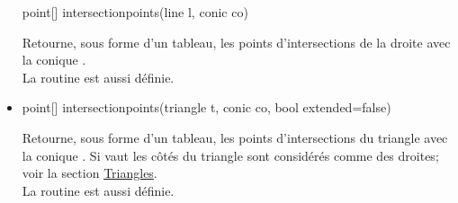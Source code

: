 \documentclass[pdftex]{article}
\begin{document}
\begin{itemize}
  \begin{Vcolor}
    point[] intersectionpoints(line l, conic co)
  \end{Vcolor}
  Retourne, sous forme d'un tableau, les points d'intersections de la
  droite  avec la conique .\\
  La routine  est aussi définie.
\item {}
  \begin{Vcolor}
    point[] intersectionpoints(triangle t, conic co, bool extended=false)
  \end{Vcolor}
  Retourne, sous forme d'un tableau, les points d'intersections du
  triangle  avec la conique . Si 
  vaut  les côtés du triangle sont considérés comme des
  droites; voir la section \href{#section.triangles}{Triangles}.\\
  La routine  est aussi définie.
\end{itemize}
\end{document}
